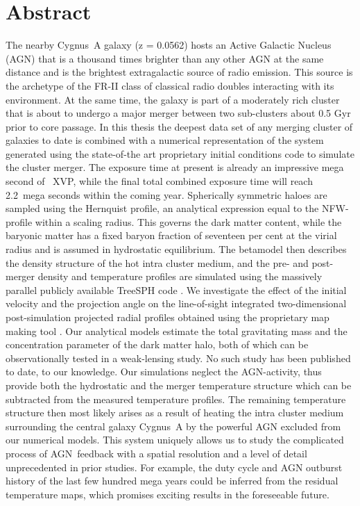 \documentclass[MScProj_TLRH_ClusterEnergy.tex]{subfiles}
\begin{document}
\chapter*{Abstract}


The nearby Cygnus~A galaxy (z = 0.0562) hosts an Active Galactic Nucleus (AGN) 
that is a thousand times brighter than any other AGN at the same distance and
is the brightest extragalactic source of radio emission. This source is the 
archetype of the FR-II class of classical radio doubles interacting with its 
environment. At the same time, the galaxy is part of a moderately rich cluster
that is about to undergo a major merger between two sub-clusters about 0.5 Gyr
prior to core passage. In this thesis the deepest data set of any merging cluster 
of galaxies to date is combined with a numerical representation of the system 
generated using the state-of-the art proprietary initial conditions code
 to simulate the cluster merger. The exposure time at present
is already an impressive mega second of ~XVP, while the 
final total combined exposure time will reach 2.2~mega seconds within the coming
year. Spherically symmetric haloes are sampled using the Hernquist profile, an 
analytical expression equal to the NFW-profile within a scaling radius. This 
governs the dark matter content, while the baryonic matter has a fixed baryon 
fraction of seventeen per cent at the virial radius and is assumed in 
hydrostatic equilibrium. The betamodel then describes the density structure of the
hot intra cluster medium, and the pre- and post-merger density and temperature
profiles are simulated using the massively parallel publicly available TreeSPH 
code . We investigate the effect of the initial velocity and the
projection angle on the line-of-sight integrated two-dimensional post-simulation
projected radial profiles obtained using the proprietary map making tool
. Our analytical models estimate the total gravitating mass and the 
concentration parameter of the dark matter halo, both of which can be 
observationally tested in a weak-lensing study. No such study has been published 
to date, to our knowledge. Our simulations neglect the AGN-activity, thus provide
both the hydrostatic and the merger temperature structure which can be 
subtracted from the measured temperature profiles. The remaining temperature 
structure then most likely arises as a result of heating the intra cluster medium
surrounding the central galaxy Cygnus~A by the powerful AGN excluded from our
numerical models. This system uniquely allows us to study the complicated process
of AGN~feedback with a spatial resolution and a level of detail unprecedented in
prior studies. For example, the duty cycle and AGN outburst history of the last 
few hundred mega years could be inferred from the residual temperature maps, which
promises exciting results in the foreseeable future. 


\end{document}
